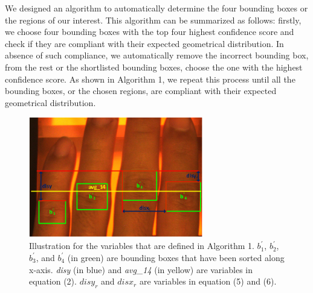 We designed an algorithm to automatically determine the four bounding boxes or the regions of our interest. This algorithm can be summarized as follows: firstly, we choose four bounding boxes with the top four highest confidence score and check if they are compliant with their expected geometrical distribution. In absence of such compliance, we automatically remove the incorrect bounding box, from the rest or the shortlisted bounding boxes, choose the one with the highest confidence score. As shown in Algorithm 1, we repeat this process until all the bounding boxes, or the chosen regions, are compliant with their expected geometrical distribution.

\begin{figure}[!ht]
    \centering
    \includegraphics[width=3in]{Figures/select-algorithm.png}
    \caption{Illustration for the variables that are defined in Algorithm 1. $b_1^{'}$, $b_2^{'}$, $b_3^{'}$, and $b_4^{'}$ (in green) are bounding boxes that have been sorted along x-axis. \textit{disy} (in blue) and \textit{avg\_14} (in yellow) are variables in equation (2). $disy_r$ and $disx_r$ are variables in equation (5) and (6).}
    \label{select-algorithm}
\end{figure}


